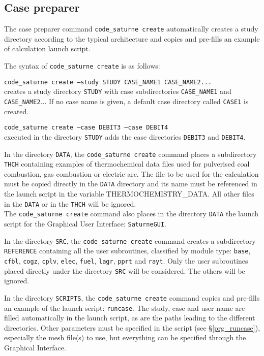 {{{%
\subsection{Case preparer}
\label{prg_cscreate}%
The case preparer command \texttt{code\_saturne~create} automatically creates a
study directory according to the typical architecture and copies and
pre-fills an example of calculation launch script.

The syntax of \texttt{code\_saturne~create} is as follows:

\noindent
\texttt{code\_saturne~create --study STUDY CASE\_NAME1 CASE\_NAME2...}\\
creates a study directory \texttt{STUDY} with case subdirectories
\texttt{CASE\_NAME1} and \texttt{CASE\_NAME2}...
If no case name is given, a default case directory called \texttt{CASE1} is
created.

\noindent
\texttt{code\_saturne~create --case DEBIT3 --case DEBIT4}\\
executed in the directory \texttt{STUDY} adds the case directories
\texttt{DEBIT3} and \texttt{DEBIT4}.

In the directory \texttt{DATA}, the \texttt{code\_saturne~create} command
places a subdirectory \texttt{THCH} containing examples of thermochemical data
files used for pulverised coal combustion,
gas combustion or electric arc. The file to be used for the calculation must be
copied directly in the \texttt{DATA} directory and its name must be referenced
in the launch script in the variable THERMOCHEMISTRY\_DATA. All other files in
the \texttt{DATA} or in the \texttt{THCH} will be ignored.\\
The \texttt{code\_saturne~create} command also places in the directory
\texttt{DATA} the launch script for the Graphical User Interface:
\texttt{SaturneGUI}.


In the directory \texttt{SRC}, the \texttt{code\_saturne~create} command creates a
subdirectory \texttt{REFERENCE} containing all the user subroutines,
classified by module type:  \texttt{base},
\texttt{cfbl}, \texttt{cogz}, \texttt{cplv}, \texttt{elec}, \texttt{fuel},
\texttt{lagr}, \texttt{pprt} and \texttt{rayt}.
Only the user subroutines placed directly under
the directory \texttt{SRC} will be considered. The others will be ignored.

In the directory \texttt{SCRIPTS}, the \texttt{code\_saturne~create} command copies and
pre-fills an example of the launch script: \texttt{runcase}.
The study, case and user name are filled
automatically in the launch script, as are the paths leading to the
different directories. Other parameters must be specified in the script
(see \S\ref{prg_runcase}),
especially the mesh file(s) to use, but everything can be specified
through the Graphical Interface.

}}}
